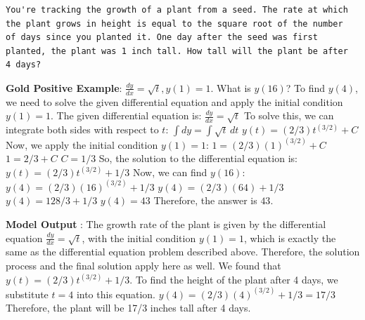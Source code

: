 \begin{example}
\begin{lstlisting}
You're tracking the growth of a plant from a seed. The rate at which 
the plant grows in height is equal to the square root of the number 
of days since you planted it. One day after the seed was first 
planted, the plant was 1 inch tall. How tall will the plant be after 
4 days?
  \end{lstlisting}
\end{example}
\begin{correctanswer}
\small{\textbf{Gold Positive Example}: 
  ${\frac{dy}{dx}} = \sqrt{t}, y(1) = 1$. What is $y(16)$?\newline\newline
  To find $y(4)$, we need to solve the given differential equation and apply the initial condition $y(1) = 1$.\newline
  The given differential equation is: ${\frac{dy}{dx}} = \sqrt{t}$\newline
  To solve this, we can integrate both sides with respect to $t$:\newline
  $\int dy = \int \sqrt{t} \, dt$\newline
  $y(t) = (2/3)t^{(3/2)} + C$ \newline
  Now, we apply the initial condition $y(1) = 1$: \newline
  $1 = (2/3)(1)^{(3/2)} + C$\newline
  $1 = 2/3 + C$\newline
  $C = 1/3$\newline
  So, the solution to the differential equation is: $y(t) = (2/3)t^{(3/2)} + 1/3$\newline
  Now, we can find $y(16)$:\newline
  $y(4) = (2/3)(16)^{(3/2)} + 1/3$\newline
  $y(4) = (2/3)(64) + 1/3$\newline
  $y(4) = 128/3 + 1/3$\newline
  $y(4) = 43$\newline
  Therefore, the answer is $43$.\newline
  }

  \small{\textbf{Model Output \cmark}: The growth rate of the plant is given by the differential equation $\frac{dy}{dx} = \sqrt{t}$, with the initial condition $y(1) = 1$, which is exactly the same as the differential equation problem described above. Therefore, the solution process and the final solution apply here as well. We found that $y(t) = (2/3)t^(3/2) + 1/3$. To find the height of the plant after 4 days, we substitute $t = 4$ into this equation.\newline
  $y(4) = (2/3)(4)^(3/2) + 1/3 = 17/3$\newline
  Therefore, the plant will be 17/3 inches tall after 4 days. }
\end{correctanswer}


